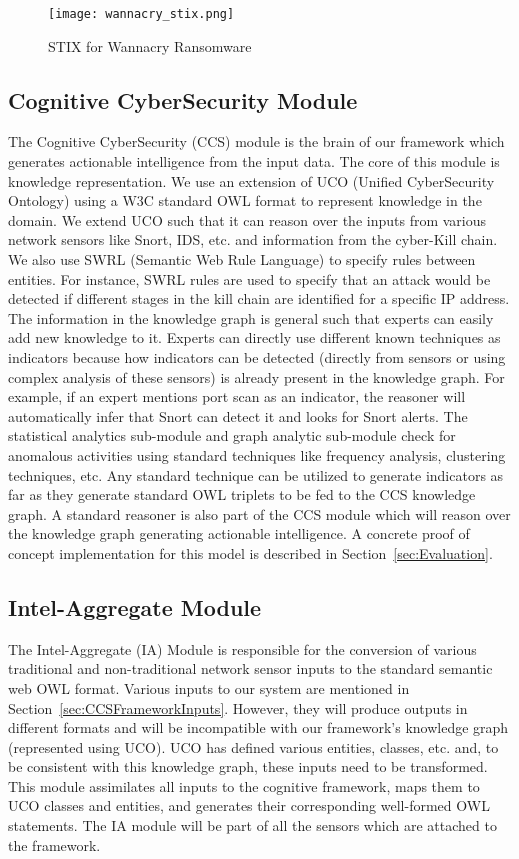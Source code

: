 \begin{figure}	
	\texttt{[image: wannacry\_stix.png]}
	\caption{STIX for Wannacry Ransomware}	
	\label{fig:wannacry_stix}
\end{figure}


\subsection{Cognitive CyberSecurity Module}

The Cognitive CyberSecurity (CCS) module is the brain of our framework which generates actionable intelligence from the input data. The core of this module is knowledge representation. We use an extension of UCO (Unified CyberSecurity Ontology) using a W3C standard OWL format to represent knowledge in the domain. We extend UCO such that it can reason over the inputs from various network sensors like Snort, IDS, etc. and information from the cyber-Kill chain. We also use SWRL (Semantic Web Rule Language) to specify rules between entities. For instance, SWRL rules are used to specify that an attack would be detected if different stages in the kill chain are identified for a specific IP address. The information in the knowledge graph is general such that experts can easily add new knowledge to it. Experts can directly use different known techniques as indicators because how indicators can be detected (directly from sensors or using complex analysis of these sensors) is already present in the knowledge graph. For example, if an expert mentions port scan as an indicator, 
the reasoner will automatically infer that Snort can detect it and looks for Snort alerts. 
The statistical analytics sub-module and graph analytic sub-module check for anomalous activities using standard techniques like frequency analysis, clustering techniques, etc. Any standard technique can be utilized to generate indicators as far as they generate standard OWL triplets to be fed to the CCS knowledge graph. A standard reasoner is also part of the CCS module which will reason over the knowledge graph generating actionable intelligence. A concrete proof of concept implementation for this model is described in Section~\ref{sec:Evaluation}.

\subsection{Intel-Aggregate Module}

The Intel-Aggregate (IA) Module is responsible for the conversion of various traditional and non-traditional network sensor inputs to the standard semantic web OWL format. Various inputs to our system are mentioned in Section~\ref{sec:CCSFrameworkInputs}. However, they will produce outputs in different formats and will be incompatible with our framework's knowledge graph (represented using UCO). UCO has defined various entities, classes, etc. and, to be consistent with this knowledge graph, these inputs need to be transformed. This module assimilates all inputs to the cognitive framework, maps them to UCO classes and entities, and generates their corresponding well-formed OWL statements. The IA module will be part of all the sensors which are attached to the framework.
